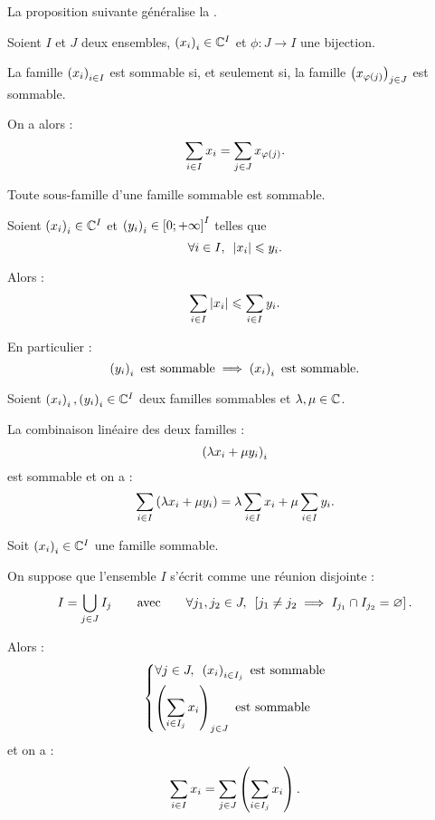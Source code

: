 \begin{rem}
La proposition suivante généralise la .
\end{rem}

\begin{prop}
Soient \(I\) et \(J\) deux ensembles, \(\left(x_i\right)_i\in\mathbb{C}^I\) et \(\phi:J\to I\) une bijection.

La famille \(\left(x_i\right)_{i\in I}\) est sommable si, et seulement si, la famille \(\left(x_{\varphi\left(j\right)}\right)_{j\in J}\) est sommable.

On a alors : \[\sum_{i\in I}x_i=\sum_{j\in J}x_{\varphi\left(j\right)}.\]
\end{prop}

\begin{prop}
Toute sous-famille d'une famille sommable est sommable.
\end{prop}

\begin{prop}
Soient \(\left(x_i\right)_i\in\mathbb{C}^I\) et \(\left(y_i\right)_i\in\left[0;+\infty\right]^I\) telles que \[\quantifs{\forall i\in I}\abs{x_i}\leq y_i.\]

Alors : \[\sum_{i\in I}\left\lvert x_i\right\rvert\leqslant\sum_{i\in I}y_i.\]

En particulier : \[\left(y_i\right)_i\text{ est sommable}\implies\left(x_i\right)_i\text{ est sommable}.\]
\end{prop}

\begin{prop}
Soient \(\left(x_i\right)_i,\left(y_i\right)_i\in\mathbb{C}^I\) deux familles sommables et \(\lambda,\mu\in\mathbb{C}\).

La combinaison linéaire des deux familles : \[\left(\lambda x_i+\mu y_i\right)_i\] est sommable et on a : \[\sum_{i\in I}\left(\lambda x_i+\mu y_i\right)=\lambda\sum_{i\in I}x_i+\mu\sum_{i\in I}y_i.\]
\end{prop}

\begin{theo}
Soit \(\left(x_i\right)_i\in\mathbb{C}^I\) une famille sommable.

On suppose que l'ensemble \(I\) s'écrit comme une réunion disjointe : \[I=\bigunion_{j\in J}I_j\qquad\text{avec}\qquad\quantifs{\forall j_1,j_2\in J}\croch{j_1\not=j_2\imp I_{j_1}\inter I_{j_2}=\ensvide}.\]

Alors : \[\begin{dcases}
\quantifs{\forall j\in J}\paren{x_i}_{i\in I_j}\text{ est sommable} \\
\paren{\sum_{i\in I_j}x_i}_{j\in J}\text{ est sommable}
\end{dcases}\] et on a : \[\sum_{i\in I}x_i=\sum_{j\in J}\left(\sum_{i\in I_j}x_i\right).\]
\end{theo}

